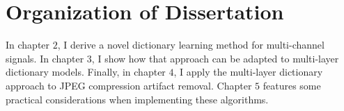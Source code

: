 \section{Organization of Dissertation}
In chapter $2$, I derive a novel dictionary learning method for multi-channel signals. In chapter $3$, I show how that approach can be adapted to multi-layer dictionary models.  Finally, in chapter $4$, I apply the multi-layer dictionary approach to JPEG compression artifact removal. Chapter $5$ features some practical considerations when implementing these algorithms.




